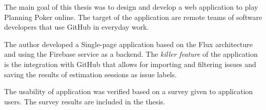 ﻿\documentclass[inzynier,druk]{dyplom}
\begin{document}
The main goal of this thesis was to design and develop a web application to play
Planning Poker online. The target of the application are remote teams of software
developers that use GitHub in everyday work.

The author developed a Single-page application based on the Flux architecture
and using  the Firebase service as a backend.
The \textit{killer feature} of the application is the integration with
GitHub that allows for importing and filtering issues and saving the results of
estimation sessions as issue labels.

The usability of application was verified based on a survey given to
application users. The survey results are included in the thesis.
\endgroup
{}





















\appendixpage
\appendix



\end{document}
